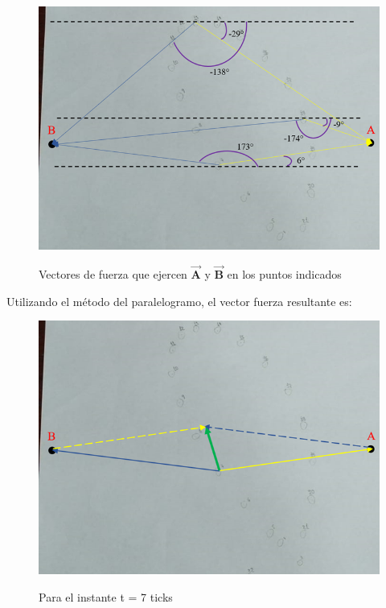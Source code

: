 \documentclass[../main.tex]{subfiles}
\begin{document}
\begin{figure}[H]
    \centering
    \includegraphics[width=0.8\linewidth]{images/calc3.png}
    \label{ref:calc3}
    \caption{Vectores de fuerza que ejercen $\vec{\mathbf{A}}$ y $\vec{\mathbf{B}}$ en los puntos indicados}
\end{figure}

Utilizando el método del paralelogramo, el vector fuerza resultante es: 

\begin{figure}[H]
    \centering
    \includegraphics[width=0.8\linewidth]{images/calc4.png}
    \label{ref:calc4}
    \caption{Para el instante t = 7 ticks}
\end{figure}
\end{document}
